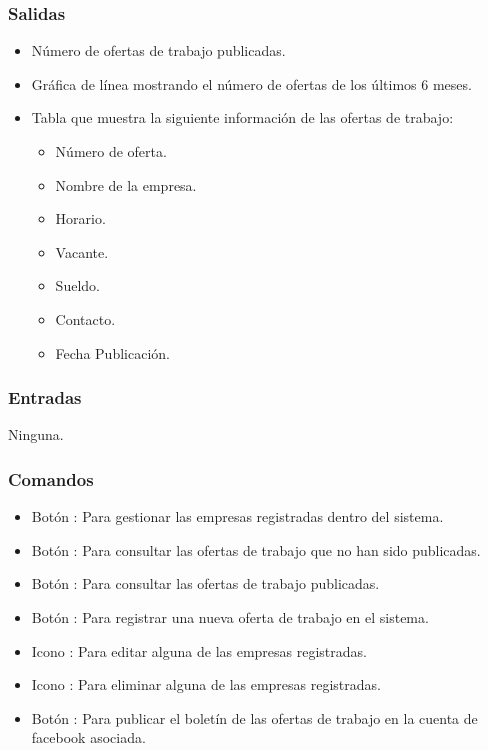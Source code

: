 \pagebreak
{}

\subsubsection{Salidas}
\begin{itemize}
	\item Número de ofertas de trabajo publicadas.
	\item Gráfica de línea mostrando el número de ofertas de los últimos 6 meses.
	\item Tabla que muestra la siguiente información de las ofertas de trabajo:
	\begin{itemize}
 		\item Número de oferta.
		\item Nombre de la empresa.
		\item Horario.
		\item Vacante.
		\item Sueldo.
		\item Contacto.
		\item Fecha Publicación.
	\end{itemize}	
\end{itemize}

\subsubsection{Entradas}
	\noindent
	Ninguna.

\subsubsection{Comandos}
	\begin{itemize}
		\item Botón : Para gestionar las empresas registradas dentro del sistema.
		\item Botón : Para consultar las ofertas de trabajo que no han sido publicadas.
		\item Botón : Para consultar las ofertas de trabajo publicadas.
		\item Botón : Para registrar una nueva oferta de trabajo en el sistema.  
		\item Icono : Para editar alguna de las empresas registradas.
		\item Icono : Para eliminar alguna de las empresas registradas.
		\item Botón : Para publicar el boletín de las ofertas de trabajo en la cuenta de facebook asociada.
	\end{itemize}


